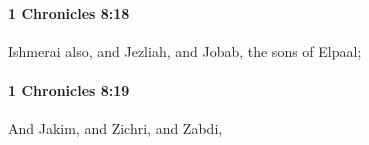 		\paragraph{1 Chronicles 8:18} %
			\label{1CHRONICLES-8-18}

			Ishmerai also, and Jezliah, and Jobab, the sons of Elpaal;


		\paragraph{1 Chronicles 8:19} %
			\label{1CHRONICLES-8-19}

			And Jakim, and Zichri, and Zabdi,


